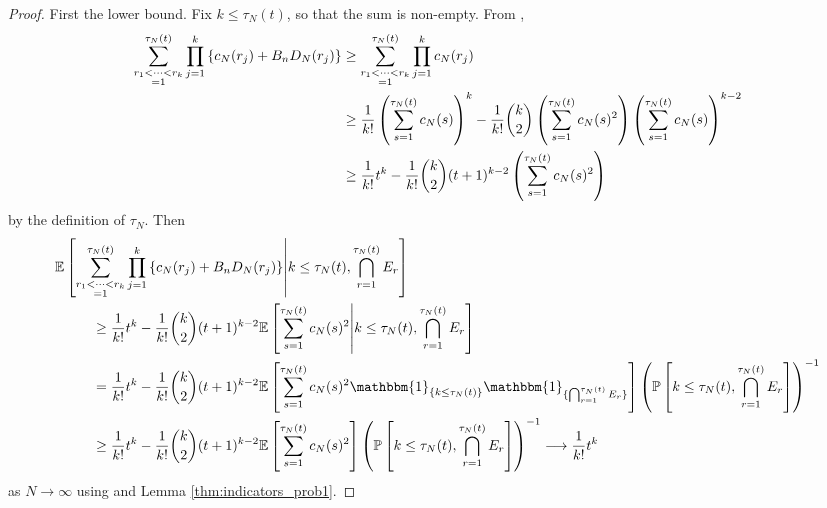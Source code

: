 \documentclass{article}
\newcommand{\Prob}{\mathbb{P}}
\newcommand{\E}{\mathbb{E}}
\newcommand{\I}[1]{\mathbbm{1}_{\{#1\}}}
\newcommand{\1}[1]{\mathbbm{1}_{#1}}
\begin{document}
\begin{proof}
First the lower bound. 
Fix $k\leq \tau_N(t)$, so that the sum is non-empty.
From \citet[Equation (8)]{koskela2018},
\begin{align}
\sum_{\substack{r_1<\dots<r_k \\ =1}}^{\tau_N(t)}\prod_{j=1}^k 
\left\{ c_N(r_j) + B_n D_N(r_j) \right\}
&\geq \sum_{\substack{r_1<\dots<r_k \\ =1}}^{\tau_N(t)}\prod_{j=1}^k c_N(r_j) \notag\\
&\geq \frac{1}{k!} \left( \sum_{s=1}^{\tau_N(t)} c_N(s) \right)^k 
- \frac{1}{k!} \binom{k}{2} \left( \sum_{s=1}^{\tau_N(t)} c_N(s)^2 \right)
\left( \sum_{s=1}^{\tau_N(t)} c_N(s) \right)^{k-2} \notag\\
&\geq \frac{1}{k!} t^k
 - \frac{1}{k!} \binom{k}{2} (t+1)^{k-2} \left( \sum_{s=1}^{\tau_N(t)} c_N(s)^2 \right) \label{eq:14}
\end{align}
by the definition of $\tau_N$.
Then
\begin{align}\label{eq:10}
\E &\left[ \sum_{\substack{r_1<\dots<r_k \\ =1}}^{\tau_N(t)}\prod_{j=1}^k 
\left\{ c_N(r_j) + B_n D_N(r_j) \right\}  
\middle| k\leq\tau_N(t), \bigcap_{r=1}^{\tau_N(t)} E_r \right] \notag\\
&\qquad \geq \frac{1}{k!} t^k - \frac{1}{k!} \binom{k}{2} (t+1)^{k-2} \E\left[ \sum_{s=1}^{\tau_N(t)} c_N(s)^2 \middle| k\leq\tau_N(t), \bigcap_{r=1}^{\tau_N(t)} E_r \right] \notag\\
&\qquad = \frac{1}{k!} t^k - \frac{1}{k!} \binom{k}{2} (t+1)^{k-2} \E\left[ \sum_{s=1}^{\tau_N(t)} c_N(s)^2 \I{k\leq\tau_N(t)} \I{\bigcap_{r=1}^{\tau_N(t)} E_r} \right] \left(\Prob \left[k\leq\tau_N(t), \bigcap_{r=1}^{\tau_N(t)} E_r \right] \right)^{-1}  \notag\\
&\qquad \geq \frac{1}{k!} t^k - \frac{1}{k!} \binom{k}{2} (t+1)^{k-2} \E\left[ \sum_{s=1}^{\tau_N(t)} c_N(s)^2 \right]
\left(\Prob \left[k\leq\tau_N(t), \bigcap_{r=1}^{\tau_N(t)} E_r \right] \right)^{-1}
\longrightarrow \frac{1}{k!} t^k
\end{align}
as $N\to\infty$ using \citet[Equation (3.5)]{brown2021} and Lemma \ref{thm:indicators_prob1}. %


\end{proof}
\end{document}
